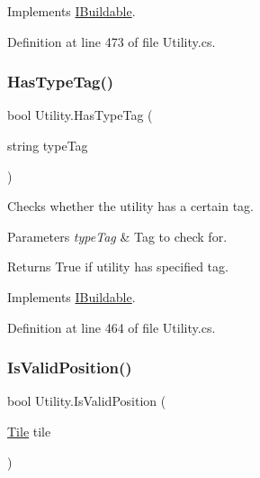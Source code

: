 Implements \hyperlink{interface_i_buildable_ab1f899fc1d9ece21b46612d6119f744d}{I\+Buildable}.



Definition at line 473 of file Utility.\+cs.

\mbox{\label{class_utility_ac16027b44fefca96cea2491461a7d36c}} 
\subsubsection{\texorpdfstring{Has\+Type\+Tag()}{HasTypeTag()}}
{\footnotesize\ttfamily bool Utility.\+Has\+Type\+Tag (\begin{DoxyParamCaption}\item[{string}]{type\+Tag }\end{DoxyParamCaption})}



Checks whether the utility has a certain tag. 


\begin{DoxyParams}{Parameters}
{\em type\+Tag} & Tag to check for.\\
\hline
\end{DoxyParams}
\begin{DoxyReturn}{Returns}
True if utility has specified tag.
\end{DoxyReturn}


Implements \hyperlink{interface_i_buildable_a4569a897fc2ac7c0ecfaddc518fa346f}{I\+Buildable}.



Definition at line 464 of file Utility.\+cs.

\mbox{\label{class_utility_a1b84a54773d5d229afc911c4f1bdb66d}} 
\subsubsection{\texorpdfstring{Is\+Valid\+Position()}{IsValidPosition()}}
{\footnotesize\ttfamily bool Utility.\+Is\+Valid\+Position (\begin{DoxyParamCaption}\item[{\hyperlink{class_tile}{Tile}}]{tile }\end{DoxyParamCaption})}



